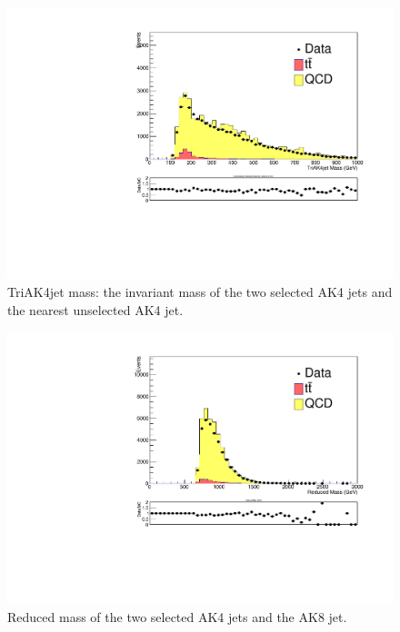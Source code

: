 \begin{figure}[h]
\begin{center}
\includegraphics[scale=0.5]{Figures/ratMCinvmsnAK4cl.pdf}
\end{center}
\caption{TriAK4jet mass: the invariant mass of the two selected AK4 jets and the nearest unselected AK4 jet.}
\label{fig:dMCtriak4jetm}
\end{figure} 

\begin{figure}[h]
\begin{center}
\includegraphics[scale=0.5]{Figures/ratMCredmass.pdf}
\end{center}
\caption{Reduced mass of the two selected AK4 jets and the AK8 jet.}
\label{fig:dMCredm}
\end{figure} 


